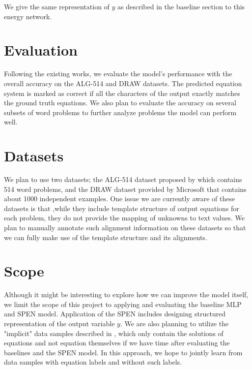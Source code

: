 \documentclass[11pt,letterpaper]{article}
\begin{document}
We give the same representation of $y$ as described in the baseline section to this energy network.
\section{Evaluation}
Following the existing works, we evaluate the model's performance with the overall accuracy on the ALG-514 and DRAW datasets. The predicted equation system is marked as correct if all the characters of the output exactly matches the ground truth equations. We also plan to evaluate the accuracy on several subsets of word problems to further analyze problems the model can perform well.
\section{Datasets}
We plan to use two datasets; the ALG-514 dataset proposed by \cite{Kushman2014LearningTA} which contains 514 word problems, and the DRAW dataset provided by Microsoft that contains about 1000 independent examples. One issue we are currently aware of these datasets is that ,while they include template structure of output equations for each problem, they do not provide the mapping of unknowns to text values. We plan to manually annotate such alignment information on these datasets so that we can fully make use of the template structure and its alignments.
\section{Scope}
Although it might be interesting to explore how we can improve the model itself, we limit the scope of this project to applying and evaluating the baseline MLP and SPEN model. Application of the SPEN includes designing structured representation of the output variable $y$. We are also planning to utilize the "implicit" data samples described in \cite{UpChChYi16}, which only contain the solutions of equations and not equation themselves if we have time after evaluating the baselines and the SPEN model. In this approach, we hope to jointly learn from data samples with equation labels and without such labels.
%
\nocite{*}


\end{document}
